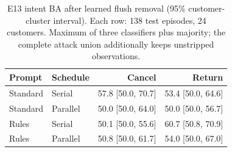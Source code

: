 \begin{table}[t]\centering\footnotesize
\caption{E13 intent BA after learned flush removal (95\% customer-cluster interval). Each row: 138 test episodes, 24 customers. Maximum of three classifiers plus majority; the complete attack union additionally keeps unstripped observations.}\label{tab:r8-flush}
\begin{tabular}{@{}llrr@{}}\toprule
Prompt & Schedule & Cancel & Return\\\midrule
Standard & Serial & 57.8 [50.0, 70.7] & 53.4 [50.0, 64.6]\\
Standard & Parallel & 50.0 [50.0, 64.0] & 50.0 [50.0, 56.7]\\
Rules & Serial & 50.1 [50.0, 55.6] & 60.7 [50.8, 70.9]\\
Rules & Parallel & 50.8 [50.0, 61.7] & 54.0 [50.0, 67.0]\\
\bottomrule\end{tabular}
\end{table}
